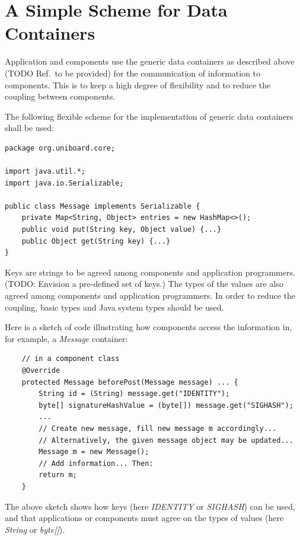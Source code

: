 \documentclass[oneside]{scrreprt}
\begin{document}
\section{A Simple Scheme for Data Containers}

Application and components use the generic data containers
as described above (TODO Ref.\ to be provided) for the
communication of information to components. This is to keep a high
degree of flexibility and to reduce the coupling between
components.

The following flexible scheme for the implementation of generic
data containers shall be used:

\begin{lstlisting}
package org.uniboard.core;

import java.util.*;
import java.io.Serializable;

public class Message implements Serializable {
    private Map<String, Object> entries = new HashMap<>();
    public void put(String key, Object value) {...}
    public Object get(String key) {...}
}
\end{lstlisting}

Keys are strings to be agreed among components and application
programmers. (TODO: Envision a pre-defined set of keys.)
The types of the values are also
agreed among components and application programmers.
In order to reduce the
coupling, basic types and Java system types should be used.

Here is a sketch of code illustrating how components access
the information in, for example, a \emph{Message} container:

\begin{lstlisting}
    // in a component class
    @Override
    protected Message beforePost(Message message) ... {
        String id = (String) message.get("IDENTITY");
        byte[] signatureHashValue = (byte[]) message.get("SIGHASH");
        ...
        // Create new message, fill new message m accordingly...
        // Alternatively, the given message object may be updated...
        Message m = new Message();
        // Add information... Then:
        return m;
    }
\end{lstlisting}

The above sketch shows how keys (here \emph{IDENTITY} or \emph{SIGHASH})
can be used, and that applications or components must agree on
the types of values (here \emph{String} or \emph{byte[]}).

% 
\end{document}
